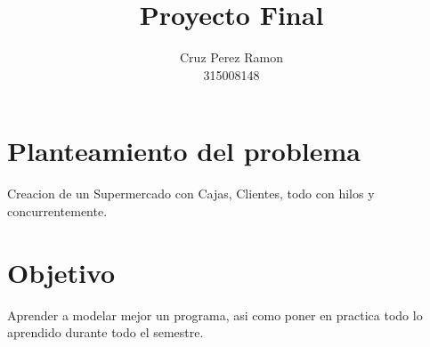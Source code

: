 \documentclass[12pt]{article}
\title{Proyecto Final}
\author{Cruz Perez Ramon\\315008148}
\begin{document}
\maketitle

\section{Planteamiento del problema}
Creacion de un Supermercado con Cajas, Clientes, todo con hilos y concurrentemente.

\section{Objetivo}
Aprender a modelar mejor un programa, asi como poner en practica todo lo aprendido durante todo el semestre.
\end{document}
